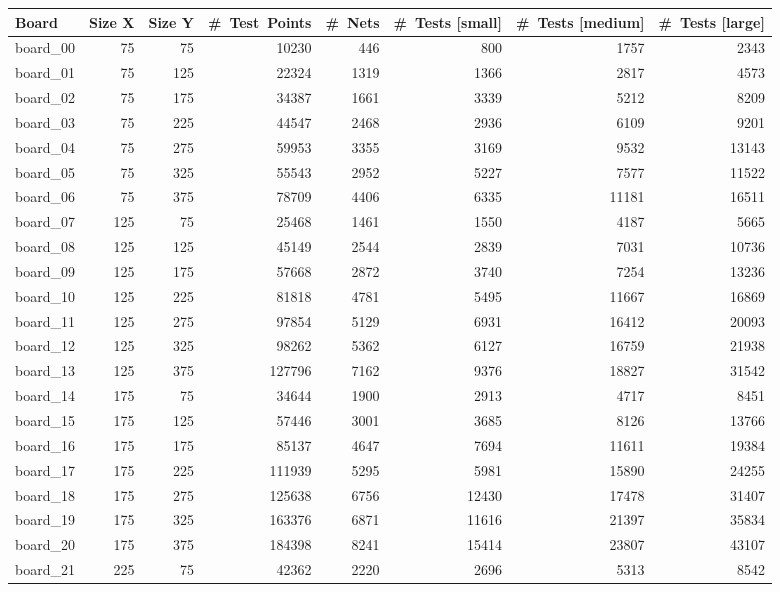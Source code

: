 
\begin{table*}[!htb]
\small
\begin{center}
\begin{tabular}{|l|rr|rr|rrr|}
\hline
Board & Size X & Size Y & \#~Test~Points & \#~Nets & \#~Tests [small] & \#~Tests [medium] & \#~Tests [large] \\
\hline
board\_00 & 75 & 75 & 10230 & 446 & 800 & 1757 & 2343 \\
board\_01 & 75 & 125 & 22324 & 1319 & 1366 & 2817 & 4573 \\
board\_02 & 75 & 175 & 34387 & 1661 & 3339 & 5212 & 8209 \\
board\_03 & 75 & 225 & 44547 & 2468 & 2936 & 6109 & 9201 \\
board\_04 & 75 & 275 & 59953 & 3355 & 3169 & 9532 & 13143 \\
board\_05 & 75 & 325 & 55543 & 2952 & 5227 & 7577 & 11522 \\
board\_06 & 75 & 375 & 78709 & 4406 & 6335 & 11181 & 16511 \\
board\_07 & 125 & 75 & 25468 & 1461 & 1550 & 4187 & 5665 \\
board\_08 & 125 & 125 & 45149 & 2544 & 2839 & 7031 & 10736 \\
board\_09 & 125 & 175 & 57668 & 2872 & 3740 & 7254 & 13236 \\
board\_10 & 125 & 225 & 81818 & 4781 & 5495 & 11667 & 16869 \\
board\_11 & 125 & 275 & 97854 & 5129 & 6931 & 16412 & 20093 \\
board\_12 & 125 & 325 & 98262 & 5362 & 6127 & 16759 & 21938 \\
board\_13 & 125 & 375 & 127796 & 7162 & 9376 & 18827 & 31542 \\
board\_14 & 175 & 75 & 34644 & 1900 & 2913 & 4717 & 8451 \\
board\_15 & 175 & 125 & 57446 & 3001 & 3685 & 8126 & 13766 \\
board\_16 & 175 & 175 & 85137 & 4647 & 7694 & 11611 & 19384 \\
board\_17 & 175 & 225 & 111939 & 5295 & 5981 & 15890 & 24255 \\
board\_18 & 175 & 275 & 125638 & 6756 & 12430 & 17478 & 31407 \\
board\_19 & 175 & 325 & 163376 & 6871 & 11616 & 21397 & 35834 \\
board\_20 & 175 & 375 & 184398 & 8241 & 15414 & 23807 & 43107 \\
board\_21 & 225 & 75 & 42362 & 2220 & 2696 & 5313 & 8542 \\

\end{tabular}
\end{center}
\end{table*}
